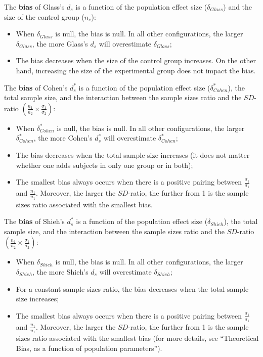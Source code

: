 \documentclass[
  english,
  man]{apa6}
\providecommand{\tightlist}{%
  \setlength{\itemsep}{0pt}\setlength{\parskip}{0pt}}
\begin{document}
The \textbf{bias} of Glass's \(d_s\) is a function of the population effect size (\(\delta_{Glass}\)) and the size of the control group (\(n_e\)):

\begin{itemize}
\tightlist
\item
  When \(\delta_{Glass}\) is null, the bias is null. In all other configurations, the larger \(\delta_{Glass}\), the more Glass's \(d_s\) will overestimate \(\delta_{Glass}\);\\
\item
  The bias decreases when the size of the control group increases. On the other hand, increasing the size of the experimental group does not impact the bias.
\end{itemize}

The \textbf{bias} of Cohen's \(d^*_s\) is a function of the population effect size (\(\delta^*_{Cohen}\)), the total sample size, and the interaction between the sample sizes ratio and the \(SD\)-ratio \(\left(\frac{n_1}{n_2}\times\frac{\sigma_1}{\sigma_2} \right)\):

\begin{itemize}
\tightlist
\item
  When \(\delta^*_{Cohen}\) is null, the bias is null. In all other configurations, the larger \(\delta^*_{Cohen}\), the more Cohen's \(d^*_s\) will overestimate \(\delta^*_{Cohen}\);\\
\item
  The bias decreases when the total sample size increases (it does not matter whether one adds subjects in only one group or in both);
\item
  The smallest bias always occurs when there is a positive pairing between \(\frac{\sigma_1}{\sigma_1}\) and \(\frac{n_1}{n_1}\). Moreover, the larger the \(SD\)-ratio, the further from 1 is the sample sizes ratio associated with the smallest bias.
\end{itemize}

The \textbf{bias} of Shieh's \(d^*_s\) is a function of the population effect size (\(\delta_{Shieh}\)), the total sample size, and the interaction between the sample sizes ratio and the \(SD\)-ratio \(\left(\frac{n_1}{n_2}\times\frac{\sigma_1}{\sigma_2} \right)\):

\begin{itemize}
\tightlist
\item
  When \(\delta_{Shieh}\) is null, the bias is null. In all other configurations, the larger \(\delta_{Shieh}\), the more Shieh's \(d_s\) will overestimate \(\delta_{Shieh}\);\\
\item
  For a constant sample sizes ratio, the bias decreases when the total sample size increases;\\
\item
  The smallest bias always occurs when there is a positive pairing between \(\frac{\sigma_1}{\sigma_1}\) and \(\frac{n_1}{n_1}\). Moreover, the larger the \(SD\)-ratio, the further from 1 is the sample sizes ratio associated with the smallest bias (for more details, see \enquote{Theoretical Bias, as a function of population parameters}).
\end{itemize}
\end{document}
